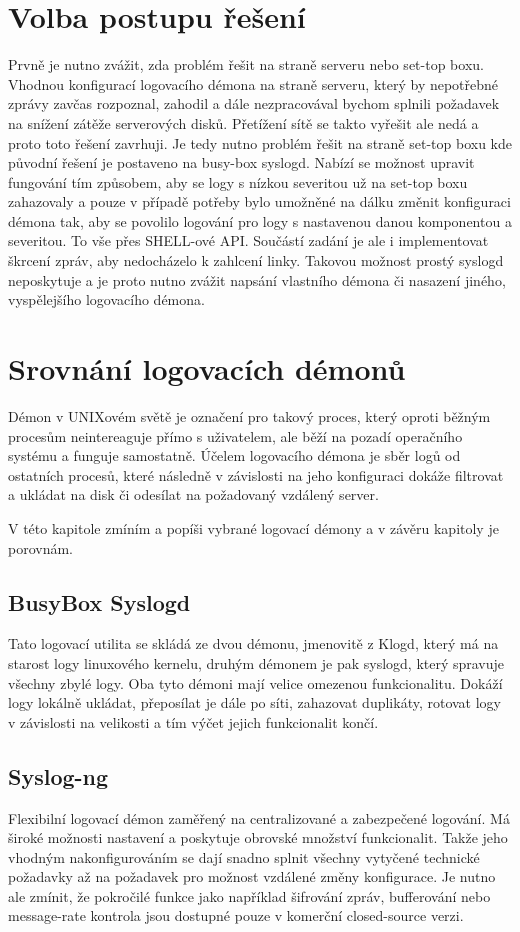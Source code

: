 \documentclass[thesis=B,czech]{FITthesis}[2012/06/26]
\begin{document}
\section{Volba postupu řešení}
Prvně je nutno zvážit, zda problém řešit na straně serveru nebo set-top boxu. Vhodnou konfigurací logovacího démona na straně serveru, který by nepotřebné zprávy zavčas rozpoznal, zahodil a dále nezpracovával bychom splnili požadavek na snížení zátěže serverových disků. Přetížení sítě se takto vyřešit ale nedá a proto toto řešení zavrhuji.
Je tedy nutno problém řešit na straně set-top boxu kde původní řešení je postaveno na busy-box syslogd. Nabízí se možnost upravit fungování tím způsobem, aby se logy s nízkou severitou už na set-top boxu zahazovaly a pouze v případě potřeby bylo umožněné na dálku změnit konfiguraci démona tak, aby se povolilo logování pro logy s nastavenou danou komponentou a severitou. To vše přes SHELL-ové API.
Součástí zadání je ale i implementovat škrcení zpráv, aby nedocházelo k zahlcení linky. Takovou možnost prostý syslogd neposkytuje a je proto nutno zvážit napsání vlastního démona či nasazení jiného, vyspělejšího logovacího démona.

\section{Srovnání logovacích démonů}
Démon v UNIXovém světě je označení pro takový proces, který oproti běžným procesům neintereaguje přímo s uživatelem, ale běží na pozadí operačního systému a funguje samostatně. Účelem logovacího démona je sběr logů od ostatních procesů, které následně v závislosti na jeho konfiguraci dokáže filtrovat a ukládat na disk či odesílat na požadovaný vzdálený server.

V této kapitole zmíním a popíši vybrané logovací démony a v závěru kapitoly je porovnám.

\subsection*{BusyBox Syslogd}
Tato logovací utilita se skládá ze dvou démonu, jmenovitě z Klogd, který má na starost logy linuxového kernelu, druhým démonem je pak syslogd, který spravuje všechny zbylé logy.
Oba tyto démoni mají velice omezenou funkcionalitu. Dokáží logy lokálně ukládat, přeposílat je dále po síti, zahazovat duplikáty, rotovat logy v závislosti na velikosti a tím výčet jejich funkcionalit končí.

\subsection*{Syslog-ng}
Flexibilní logovací démon zaměřený na centralizované a zabezpečené logování. Má široké možnosti nastavení a poskytuje obrovské množství funkcionalit. Takže jeho vhodným nakonfigurováním se dají snadno splnit všechny vytyčené technické požadavky až na požadavek pro možnost vzdálené změny konfigurace.
Je nutno ale zmínit, že pokročilé funkce jako například šifrování zpráv, bufferování nebo message-rate kontrola jsou dostupné pouze v komerční closed-source verzi.
\end{document}
